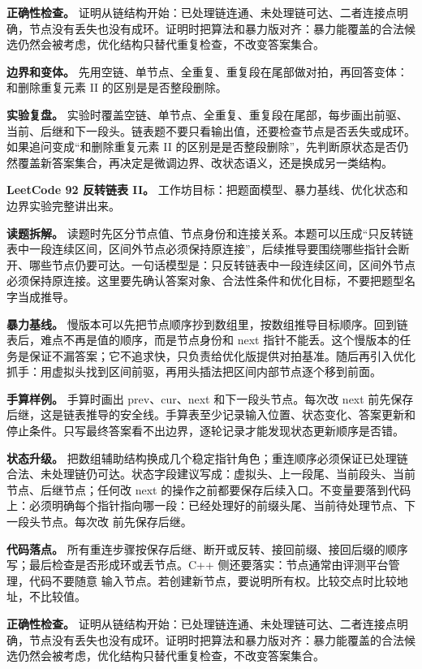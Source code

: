 \textbf{正确性检查。} 证明从链结构开始：已处理链连通、未处理链可达、二者连接点明确，节点没有丢失也没有成环。证明时把算法和暴力版对齐：暴力能覆盖的合法候选仍然会被考虑，优化结构只替代重复检查，不改变答案集合。

\textbf{边界和变体。} 先用空链、单节点、全重复、重复段在尾部做对拍，再回答变体：和删除重复元素 II 的区别是是否整段删除。

\textbf{实验复盘。} 实验时覆盖空链、单节点、全重复、重复段在尾部，每步画出前驱、当前、后继和下一段头。链表题不要只看输出值，还要检查节点是否丢失或成环。如果追问变成“和删除重复元素 II 的区别是是否整段删除”，先判断原状态是否仍然覆盖新答案集合，再决定是微调边界、改状态语义，还是换成另一类结构。

\noindent\textbf{LeetCode 92 反转链表 II。} 工作坊目标：把题面模型、暴力基线、优化状态和边界实验完整讲出来。

\textbf{读题拆解。} 读题时先区分节点值、节点身份和连接关系。本题可以压成“只反转链表中一段连续区间，区间外节点必须保持原连接”，后续推导要围绕哪些指针会断开、哪些节点仍要可达。一句话模型是：只反转链表中一段连续区间，区间外节点必须保持原连接。这里要先确认答案对象、合法性条件和优化目标，不要把题型名字当成推导。

\textbf{暴力基线。} 慢版本可以先把节点顺序抄到数组里，按数组推导目标顺序。回到链表后，难点不再是值的顺序，而是节点身份和 next 指针不能丢。这个慢版本的任务是保证不漏答案；它不追求快，只负责给优化版提供对拍基准。随后再引入优化抓手：用虚拟头找到区间前驱，再用头插法把区间内部节点逐个移到前面。

\textbf{手算样例。} 手算时画出 prev、cur、next 和下一段头节点。每次改 next 前先保存后继，这是链表推导的安全线。手算表至少记录输入位置、状态变化、答案更新和停止条件。只写最终答案看不出边界，逐轮记录才能发现状态更新顺序是否错。

\textbf{状态升级。} 把数组辅助结构换成几个稳定指针角色；重连顺序必须保证已处理链合法、未处理链仍可达。状态字段建议写成：虚拟头、上一段尾、当前段头、当前节点、后继节点；任何改 next 的操作之前都要保存后续入口。不变量要落到代码上：必须明确每个指针指向哪一段：已经处理好的前缀头尾、当前待处理节点、下一段头节点。每次改  前先保存后继。

\textbf{代码落点。} 所有重连步骤按保存后继、断开或反转、接回前缀、接回后缀的顺序写；最后检查是否形成环或丢节点。C++ 侧还要落实：节点通常由评测平台管理，代码不要随意  输入节点。若创建新节点，要说明所有权。比较交点时比较地址，不比较值。

\textbf{正确性检查。} 证明从链结构开始：已处理链连通、未处理链可达、二者连接点明确，节点没有丢失也没有成环。证明时把算法和暴力版对齐：暴力能覆盖的合法候选仍然会被考虑，优化结构只替代重复检查，不改变答案集合。

